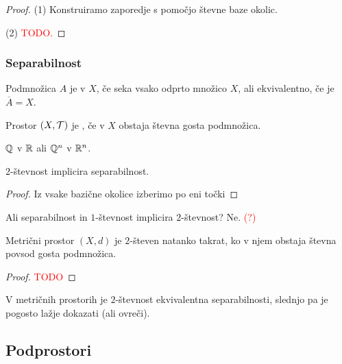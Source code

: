 \begin{proof}
    (1) Konstruiramo zaporedje s pomočjo števne baze okolic.

    (2) \textcolor{red}{TODO.}
\end{proof}

\newpage
\subsubsection{Separabilnost}
\begin{definicija}
    Podmnožica $A$ je  v $X$, če seka vsako odprto množico $X$, ali ekvivalentno, če je $\overline{A} = X$.
\end{definicija}

\begin{definicija}
    Prostor $(X, \mathcal{T})$ je , če v $X$ obstaja števna gosta podmnožica.
\end{definicija}

\begin{primer}
    $\mathbb{Q}$ v $\mathbb{R}$ ali $\mathbb{Q}^n$ v $\mathbb{R}^n$.
\end{primer}

\begin{trditev}
    $2$-števnost implicira separabilnost.
\end{trditev}

\begin{proof}
    Iz vsake bazične okolice izberimo po eni točki
\end{proof}

\begin{opomba}
    Ali separabilnost in $1$-števnost implicira $2$-števnost? Ne. \textcolor{red}{(?)}
\end{opomba}

\begin{izrek}
    Metrični prostor $(X, d)$ je $2$-števen natanko takrat, ko v njem obstaja števna povsod gosta podmnožica.
\end{izrek}

\begin{proof}
    \textcolor{red}{TODO}
\end{proof}

\begin{opomba}
    V metričnih prostorih je $2$-števnost ekvivalentna separabilnosti, slednjo pa je pogosto lažje dokazati (ali ovreči).
\end{opomba}

\subsection{Podprostori}
